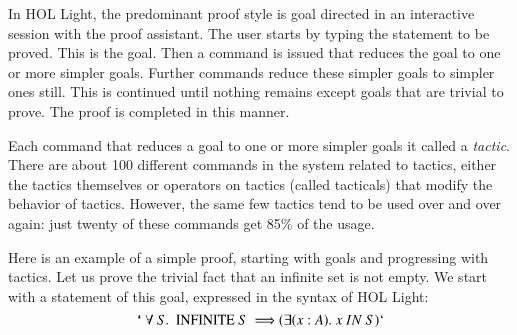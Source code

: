 \documentclass{llncs}
\def\bq{\text{\tt {`}\,}}
\begin{document}
In HOL Light, the predominant proof style is goal directed in an
interactive session with the proof assistant.  The user starts by
typing the statement to be proved.  This is the goal.  Then a command
is issued that reduces the goal to one or more simpler goals.  Further
commands reduce these simpler goals to simpler ones still.  This is
continued until nothing remains except goals that are trivial to
prove.  The proof is completed in this manner.

Each command that reduces a goal to one or more simpler goals it called a 
{\it tactic}.  There are about 100 different commands in the system related
to tactics, either the tactics themselves or operators on tactics (called tacticals) that modify the behavior of tactics.  However, the same few tactics tend to be used over and over again:  just twenty of these commands get 85\% of the usage.

Here is an example of a simple proof, starting with goals and
progressing with tactics.  Let us prove the trivial fact that an infinite set
is not empty.   We start with a statement of this goal, expressed in the syntax of HOL Light:
\[
\bq \forall~ S.~~ \text{INFINITE}~ S~ \Longrightarrow (\exists (x:A).~ x~IN~S)`
\]
\end{document}
